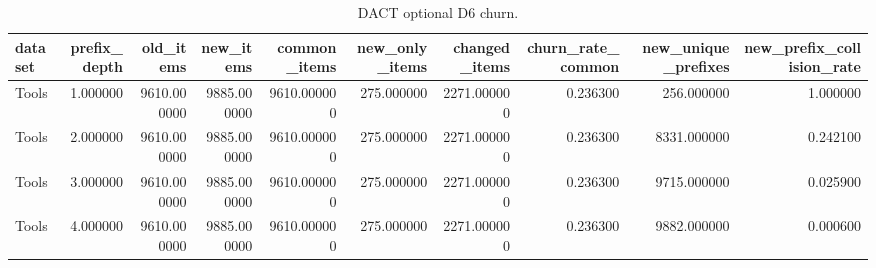 \begin{table}
\caption{DACT optional D6 churn.}
\label{tab:d6-churn}
\begin{tabular}{lrrrrrrrrr}
\toprule
dataset & prefix\_depth & old\_items & new\_items & common\_items & new\_only\_items & changed\_items & churn\_rate\_common & new\_unique\_prefixes & new\_prefix\_collision\_rate \\
\midrule
Tools & 1.000000 & 9610.000000 & 9885.000000 & 9610.000000 & 275.000000 & 2271.000000 & 0.236300 & 256.000000 & 1.000000 \\
Tools & 2.000000 & 9610.000000 & 9885.000000 & 9610.000000 & 275.000000 & 2271.000000 & 0.236300 & 8331.000000 & 0.242100 \\
Tools & 3.000000 & 9610.000000 & 9885.000000 & 9610.000000 & 275.000000 & 2271.000000 & 0.236300 & 9715.000000 & 0.025900 \\
Tools & 4.000000 & 9610.000000 & 9885.000000 & 9610.000000 & 275.000000 & 2271.000000 & 0.236300 & 9882.000000 & 0.000600 \\
\bottomrule
\end{tabular}
\end{table}

